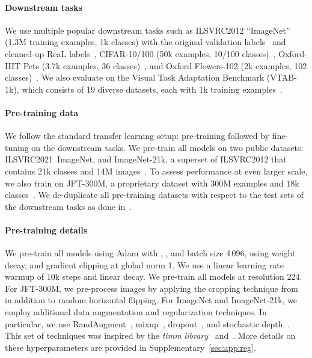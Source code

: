 \documentclass{article}
\begin{document}
\paragraph{Downstream tasks}
We use multiple popular downstream tasks such as ILSVRC2012 ``ImageNet'' (1.3M training examples, 1k classes) with the original validation labels~\citep{deng2009-imagenet} and cleaned-up ReaL labels~\citep{beyer2020-imagenet},
CIFAR-10/100 (50k examples, 10/100 classes)~\citep{Krizhevsky2009-cifar},
Oxford-IIIT Pets (3.7k examples, 36 classes)~\citep{parkhi2012-pets},
and Oxford Flowers-102 (2k examples, 102 classes)~\citep{Nilsback2008-flowers}.
We also evaluate on the Visual Task Adaptation Benchmark (VTAB-1k), which consists of 19 diverse datasets, each with 1k training examples~\citep{vtab}.

\paragraph{Pre-training data}
We follow the standard transfer learning setup: pre-training followed by fine-tuning on the downstream tasks.
We pre-train all models on two public datasets: 
ILSVRC2021~ImageNet, and ImageNet-21k, a superset of ILSVRC2012 that contains 21k classes and 14M images~\cite{deng2009-imagenet}.
To assess performance at even larger scale, we also train on JFT-300M, a proprietary dataset with 300M examples and 18k classes~\citep{sun2017-jft}.
We de-duplicate all pre-training datasets with respect to the test sets of the
downstream tasks as done in~\citet{Dosovitskiy2021,kolesnikov2020-bit}.

\paragraph{Pre-training details}
We pre-train all models using Adam with , , and
batch size 4\,096, using weight decay,
and gradient clipping at global norm 1.
We use a linear learning rate warmup of 10k steps and linear decay.
We pre-train all models at resolution 224.
For JFT-300M, we pre-process images by applying the cropping technique from~\citet{szegedy15inception} in addition to random horizontal flipping.
For ImageNet and ImageNet-21k, we employ additional data augmentation and regularization techniques. In particular, we use RandAugment~\cite{cubuk2020rand}, mixup~\cite{zhang2018mixup}, dropout~\cite{srivastava14dropout}, and stochastic depth~\cite{huang2016deep}. 
This set of techniques was inspired by the \emph{timm library}~\cite{rw2019timm} and~\citet{touvron2019}. 
More details on these hyperparameters are provided in Supplementary~\ref{sec:app:reg}.
\end{document}
